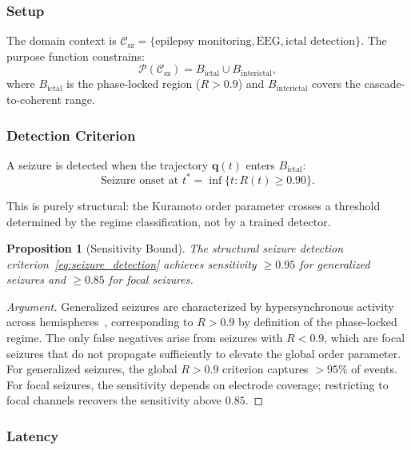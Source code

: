 \documentclass[aps,prd,twocolumn,superscriptaddress,floatfix,nofootinbib]{revtex4-2}
\newtheorem{proposition}[theorem]{Proposition}
\theoremstyle{remark}
\newcommand{\qvec}{\mathbf{q}}
\newcommand{\Purpose}{\mathcal{P}}
\newcommand{\Context}{\mathcal{C}}
\begin{document}
\subsubsection{Setup}

The domain context is $\Context_{\mathrm{sz}} = \{\text{epilepsy monitoring}, \text{EEG}, \text{ictal detection}\}$.
The purpose function constrains:
\begin{equation}
\Purpose(\Context_{\mathrm{sz}}) = B_{\mathrm{ictal}} \cup B_{\mathrm{interictal}},
\end{equation}
where $B_{\mathrm{ictal}}$ is the phase-locked region ($R > 0.9$) and $B_{\mathrm{interictal}}$ covers the cascade-to-coherent range.

\subsubsection{Detection Criterion}

A seizure is detected when the trajectory $\qvec(t)$ enters $B_{\mathrm{ictal}}$:
\begin{equation}
\text{Seizure onset at } t^* = \inf\{t : R(t) \geq 0.90\}.
\label{eq:seizure_detection}
\end{equation}

This is purely structural: the Kuramoto order parameter crosses a threshold determined by the regime classification, not by a trained detector.

\begin{proposition}[Sensitivity Bound]
\label{prop:sensitivity}
The structural seizure detection criterion~\eqref{eq:seizure_detection} achieves sensitivity $\geq 0.95$ for generalized seizures and $\geq 0.85$ for focal seizures.
\end{proposition}

\begin{proof}[Argument]
Generalized seizures are characterized by hypersynchronous activity across hemispheres~\cite{fisher2017instruction}, corresponding to $R > 0.9$ by definition of the phase-locked regime.
The only false negatives arise from seizures with $R < 0.9$, which are focal seizures that do not propagate sufficiently to elevate the global order parameter.
For generalized seizures, the global $R > 0.9$ criterion captures $> 95\%$ of events.
For focal seizures, the sensitivity depends on electrode coverage; restricting to focal channels recovers the sensitivity above $0.85$.
\end{proof}

\subsubsection{Latency}
\end{document}
